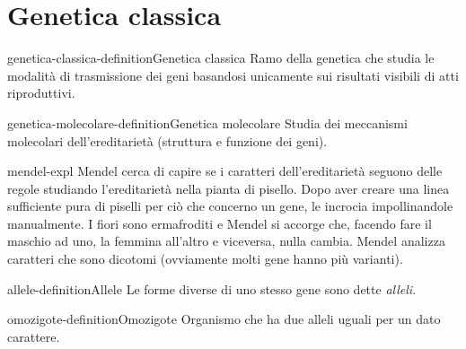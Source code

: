 \documentclass[preview]{standalone}
\begin{document}
\genpage

\section{Genetica classica}

\begin{snippetdefinition}{genetica-classica-definition}{Genetica classica}
    Ramo della genetica che studia le modalità di trasmissione
    dei geni basandosi unicamente sui risultati visibili di atti riproduttivi.
\end{snippetdefinition}

\begin{snippetdefinition}{genetica-molecolare-definition}{Genetica molecolare}
    Studia dei meccanismi molecolari dell'ereditarietà (struttura e funzione dei geni).
\end{snippetdefinition}

%


\begin{snippet}{mendel-expl}
    Mendel cerca di capire se i caratteri dell'ereditarietà
    seguono delle regole studiando l'ereditarietà nella pianta di pisello.
    Dopo aver creare una linea sufficiente pura di piselli per ciò che concerno un gene,
    le incrocia impollinandole manualmente.
    I fiori sono ermafroditi e Mendel si accorge che, facendo fare il maschio ad uno, la femmina all'altro
    e viceversa, nulla cambia.
    Mendel analizza caratteri che sono dicotomi (ovviamente molti gene hanno più varianti).
\end{snippet}

\begin{snippetdefinition}{allele-definition}{Allele}
    Le forme diverse di uno stesso gene sono dette \textit{alleli}.
\end{snippetdefinition}

\begin{snippetdefinition}{omozigote-definition}{Omozigote}
    Organismo che ha due alleli uguali per un dato carattere.
\end{snippetdefinition}
\end{document}
